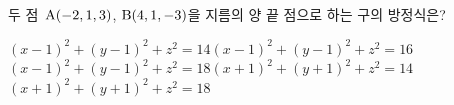두 점~$\mathrm{A}(-2{,}\mkern3mu\mathopen{}1{,}\mkern3mu\mathopen{}3)$, $\mathrm{B}(4{,}\mkern3mu\mathopen{}1{,}\mkern3mu\mathopen{}-3)$을 지름의 양 끝 점으로 하는 구의 방정식은?
\begin{choicesv}{$(x-1)^2+(y-1)^2+z^2=14$}{$(x-1)^2+(y-1)^2+z^2=16$}{$(x-1)^2+(y-1)^2+z^2=18$}{$(x+1)^2+(y+1)^2+z^2=14$}{$(x+1)^2+(y+1)^2+z^2=18$}\end{choicesv}
